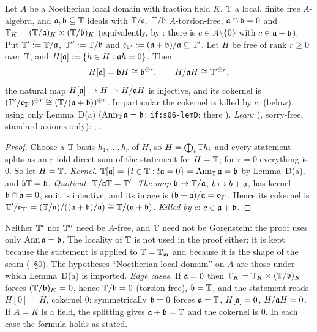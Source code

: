 \begin{proposition}\label{prop:s05-subquot}
Let $A$ be a Noetherian local domain with fraction field $K$, $\mathbb{T}$ a local, finite free $A$-algebra, and $\mathfrak{a},\mathfrak{b}\subseteq\mathbb{T}$ ideals with
$\mathbb{T}/\mathfrak{a}$, $\mathbb{T}/\mathfrak{b}$ $A$-torsion-free, $\mathfrak{a}\cap\mathfrak{b}=0$ and $\mathbb{T}_K=(\mathbb{T}/\mathfrak{a})_K\times(\mathbb{T}/\mathfrak{b})_K$ (equivalently, by :
there is $c\in A\setminus\{0\}$ with $c\in\mathfrak{a}+\mathfrak{b}$). Put $\mathbb{T}':=\mathbb{T}/\mathfrak{a}$, $\mathbb{T}'':=\mathbb{T}/\mathfrak{b}$ and $\mathfrak{c}_{\mathbb{T}'}:=(\mathfrak{a}+\mathfrak{b})/\mathfrak{a}\subseteq\mathbb{T}'$. Let $H$ be free
of rank $r\ge0$ over $\mathbb{T}$, and $H[\mathfrak{a}]:=\{h\in H:\mathfrak{a} h=0\}$. Then
\[H[\mathfrak{a}]=\mathfrak{b} H\cong\mathfrak{b}^{\oplus r},\qquad H/\mathfrak{a} H\cong\mathbb{T}'^{\oplus r},\]
the natural map $H[\mathfrak{a}]\hookrightarrow H\twoheadrightarrow H/\mathfrak{a} H$ is injective, and its cokernel is $(\mathbb{T}'/\mathfrak{c}_{\mathbb{T}'})^{\oplus r}\cong(\mathbb{T}/(\mathfrak{a}+\mathfrak{b}))^{\oplus r}$.
In particular the cokernel is killed by $c$. \stproved{} (below), using only Lemma~D(a) ($\operatorname{Ann}_{\mathbb{T}}\mathfrak{a}=\mathfrak{b}$; \texttt{if:s06-lemD}; there
\stproved).
\emph{Lean:} \stformal{} (, sorry-free, standard axioms only): , .
\end{proposition}
\begin{proof}
Choose a $\mathbb{T}$-basis $h_1,\dots,h_r$ of $H$, so $H=\bigoplus_i\mathbb{T} h_i$ and every statement splits as an $r$-fold direct sum of the statement
for $H=\mathbb{T}$; for $r=0$ everything is $0$. So let $H=\mathbb{T}$.
\emph{Kernel.} $\mathbb{T}[\mathfrak{a}]=\{t\in\mathbb{T}:t\mathfrak{a}=0\}=\operatorname{Ann}_{\mathbb{T}}\mathfrak{a}=\mathfrak{b}$ by Lemma~D(a), and $\mathfrak{b}\mathbb{T}=\mathfrak{b}$.
\emph{Quotient.} $\mathbb{T}/\mathfrak{a}\mathbb{T}=\mathbb{T}'$.
\emph{The map} $\mathfrak{b}\to\mathbb{T}/\mathfrak{a}$, $b\mapsto b+\mathfrak{a}$, has kernel $\mathfrak{b}\cap\mathfrak{a}=0$, so it is injective, and its image is $(\mathfrak{b}+\mathfrak{a})/\mathfrak{a}=\mathfrak{c}_{\mathbb{T}'}$. Hence its
cokernel is $\mathbb{T}'/\mathfrak{c}_{\mathbb{T}'}=(\mathbb{T}/\mathfrak{a})/((\mathfrak{a}+\mathfrak{b})/\mathfrak{a})\cong\mathbb{T}/(\mathfrak{a}+\mathfrak{b})$.
\emph{Killed by $c$}: $c\in\mathfrak{a}+\mathfrak{b}$.
\end{proof}
\noindent Neither $\mathbb{T}'$ nor $\mathbb{T}''$ need be $A$-free, and $\mathbb{T}$ need not be Gorenstein: the proof uses only $\operatorname{Ann}\mathfrak{a}=\mathfrak{b}$. The locality of $\mathbb{T}$
is not used in the proof either; it is kept because the statement is applied to $\mathbb{T}=\mathbb{T}_{\mathfrak{m}}$ and because it is the shape of the seam
(~\S0). The hypotheses ``Noetherian local domain'' on $A$ are those under which Lemma~D(a) is imported.
\emph{Edge cases.} If $\mathfrak{a}=0$ then $\mathbb{T}_K=\mathbb{T}_K\times(\mathbb{T}/\mathfrak{b})_K$ forces $(\mathbb{T}/\mathfrak{b})_K=0$, hence $\mathbb{T}/\mathfrak{b}=0$ (torsion-free), $\mathfrak{b}=\mathbb{T}$, and the
statement reads $H[0]=H$, cokernel $0$; symmetrically $\mathfrak{b}=0$ forces $\mathfrak{a}=\mathbb{T}$, $H[\mathfrak{a}]=0$, $H/\mathfrak{a} H=0$. If $A=K$ is a field, the splitting gives
$\mathfrak{a}+\mathfrak{b}=\mathbb{T}$ and the cokernel is $0$. In each case the formula holds as stated.

